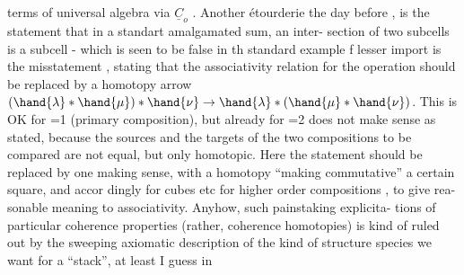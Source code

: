terms of universal algebra via $\underline{C}_o$ . Another étourderie the day before\hand{,}
 , is the statement that in a standart amalgamated sum, an inter-%
section of two  subcells is a subcell - which is seen to be false in
\margin{\unsure{[circle cut by a vertical arc, inner labels $t$, $f$, $f'$, $f''$, $s$; written beside it: $f\cup f''=f'\cup s\cup t$]}} th standard example \hand{\unsure{$\ell$}} f lesser import is the misstatement  ,
stating that the associativity relation for the operation \hand{$*_\ell$} should be
 replaced by a homotopy arrow
$(\hand{\lambda}*\hand{\mu})*\hand{\nu} \to \hand{\lambda}*(\hand{\mu}*\hand{\nu})$. This is OK for \hand{$\ell$}=1 (primary composition), but
already for \hand{$\ell$}=2 does not make sense as stated, because the sources and
the targets of the two compositions to be compared are not equal, but
only homotopic. Here the statement should be replaced by one making
sense, with a homotopy ``making commutative'' a certain square, and accor\hand{\unsure{-}}%
dingly for cubes etc for higher order compositions \hand{$\lambda *_\ell \mu$}, to give rea-%
sonable meaning to associativity. Anyhow, such painstaking explicita-%
tions of particular coherence properties (rather, coherence homotopies)
is kind of ruled out by the sweeping axiomatic description of the
kind of structure species we want for a ``stack'', at least\hand{,} I guess\hand{,} in
